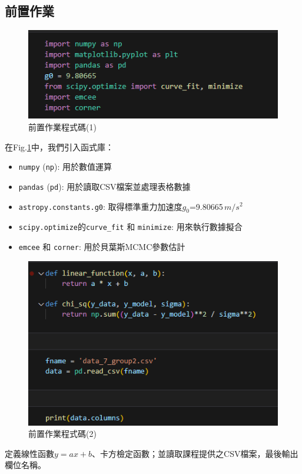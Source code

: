 \documentclass[12pt,a4paper]{article}
\begin{document}
\begin{CJK}{UTF8}{bkai}
\clearpage

\subsection{前置作業}
\hfill
\begin{figure}[h]
    \centering
    \includegraphics[width=1\linewidth]{FD1.png}
    \caption{前置作業程式碼(1)}
    \label{fig:FD1}
\end{figure}

\indent 在Fig.\ref{fig:FD1}中，我們引入函式庫：
\begin{itemize}
    \item \texttt{numpy} (\texttt{np}): 用於數值運算
    \item \texttt{pandas} (\texttt{pd}): 用於讀取CSV檔案並處理表格數據
    \item \texttt{astropy.constants.g0}: 取得標準重力加速度$g_0$=9.80665$\,m/s^2$
    \item \texttt{scipy.optimize}的\texttt{curve\_fit} 和 \texttt{minimize}: 用來執行數據擬合
    \item \texttt{emcee} 和 \texttt{corner}: 用於貝葉斯MCMC參數估計
\end{itemize}

\clearpage

\begin{figure}[h]
    \centering
    \includegraphics[width=1\linewidth]{FD2.png}
    \caption{前置作業程式碼(2)}
    \label{fig:FD2}
\end{figure}
\indent 定義線性函數$y=ax+b$、卡方檢定函數；並讀取課程提供之CSV檔案，最後輸出欄位名稱。


\end{CJK}
\end{document}
